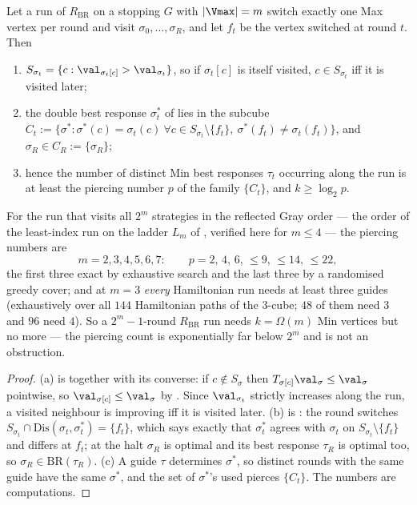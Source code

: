 \begin{proposition}\label{bsc:pierce}
Let a run of $R_{\mathrm{BR}}$ on a stopping $G$ with $|\Vmax|=m$ switch
exactly one Max vertex per round and visit $\sigma_0,\dots,\sigma_R$, and let
$f_t$ be the vertex switched at round $t$.  Then
\begin{enumerate}
\item[(a)] $S_{\sigma_t}=\{c:\val_{\sigma_t[c]}>\val_{\sigma_t}\}$, so if
 $\sigma_t[c]$ is itself visited, $c\in S_{\sigma_t}$ iff it is visited later;
\item[(b)] the double best response $\sigma^{\ast}_t$ of 
 lies in the subcube
 $C_t:=\{\sigma^{\ast}:\sigma^{\ast}(c)=\sigma_t(c)\ \forall c\in
 S_{\sigma_t}\setminus\{f_t\},\ \sigma^{\ast}(f_t)\ne\sigma_t(f_t)\}$, and
 $\sigma_R\in C_R:=\{\sigma_R\}$;
\item[(c)] hence the number of distinct Min best responses $\tau_t$ occurring
 along the run is at least the piercing number $p$ of the family
 $\{C_t\}$, and $k\ge\log_2p$.
\end{enumerate}
For the run that visits all $2^{m}$ strategies in the reflected Gray order ---
the order of the least-index run on the ladder $L_m$ of ,
verified here for $m\le4$ --- the piercing numbers are
\[
 m=2,3,4,5,6,7:\qquad p=2,\,4,\,6,\,\le9,\,\le14,\,\le22 ,
\]
the first three exact by exhaustive search and the last three by a randomised
greedy cover; and at $m=3$ \emph{every} Hamiltonian run needs at least three
guides (exhaustively over all $144$ Hamiltonian paths of the $3$-cube; $48$ of
them need $3$ and $96$ need $4$).  So a $2^{m}-1$-round $R_{\mathrm{BR}}$ run
needs $k=\Omega(m)$ Min vertices but no more --- the piercing count is
exponentially far below $2^{m}$ and is not an obstruction.
\end{proposition}

\begin{proof}
(a) is  together with its converse: if $c\notin S_\sigma$
then $T_{\sigma[c]}\val_\sigma\le\val_\sigma$ pointwise, so
$\val_{\sigma[c]}\le\val_\sigma$ by .  Since
$\val_{\sigma_t}$ strictly increases along the run, a visited neighbour is
improving iff it is visited later.  (b) is : the round
switches $S_{\sigma_t}\cap\mathrm{Dis}(\sigma_t,\sigma^{\ast}_t)=\{f_t\}$,
which says exactly that $\sigma^{\ast}_t$ agrees with $\sigma_t$ on
$S_{\sigma_t}\setminus\{f_t\}$ and differs at $f_t$; at the halt $\sigma_R$ is
optimal and its best response $\tau_R$ is optimal too, so
$\sigma_R\in\mathrm{BR}(\tau_R)$.  (c) A guide $\tau$ determines
$\sigma^{\ast}$, so distinct rounds with the same guide have the same
$\sigma^{\ast}$, and the set of $\sigma^{\ast}$'s used pierces $\{C_t\}$.  The
numbers are computations.
\end{proof}

